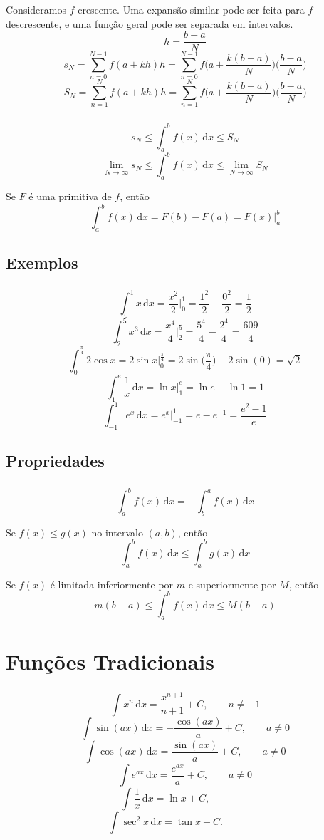 \documentclass[10 pt]{beamer}
\newcommand{\makesection}[1]{\section[#1]{#1}}
\newcommand{\makesubsection}[1]{\subsection[#1]{#1}}
\newcommand{\dif}{\,\mathrm{d}}
\newcommand{\myframe}[1]{
\begin{frame}
 \frametitle{\insertsection \qquad {\small \insertsubsection}}
#1
\end{frame}}
\newcommand{\limite}[2]{\lim_{{#1}\rightarrow{#2}}}
\newcommand{\fromto}[2]{\bigg|_{#1}^{#2}}
\begin{document}
\myframe{
  Consideramos $f$ crescente. Uma expansão similar pode ser feita para $f$
    descrescente, e uma função geral pode ser separada em intervalos.
  $$ h = \frac{b-a}{N} $$
  \vspace{0.5cm}
  $$ s_N = \sum_{n=0}^{N-1} f(a + kh)h
    = \sum_{n=0}^{N-1} f\bigg(a + \frac{k(b-a)}{N}\bigg)\bigg(\frac{b-a}{N}\bigg) $$
  $$ S_N = \sum_{n=1}^{N} f(a + kh)h
    = \sum_{n=1}^{N} f\bigg(a + \frac{k(b-a)}{N}\bigg)\bigg(\frac{b-a}{N}\bigg) $$
}

\myframe{
  $$ s_N \leq \int_a^b\! f(x)\dif x \leq S_N $$
  $$ \limite{N}{\infty} s_N \leq \int_a^b\! f(x)\dif x
    \leq \limite{N}{\infty} S_N $$
  \vspace{0.5cm}

  Se $F$ é uma primitiva de $f$, então
  $$ \int_a^b\!f(x)\dif x = F(b) - F(a) = F(x)\fromto{a}{b} $$
}

\makesubsection{Exemplos}

\myframe{
  $$ \int_0^1\!x\dif x = \frac{x^2}{2}\fromto{0}{1} =
    \frac{1^2}{2} - \frac{0^2}{2} = \frac{1}{2} $$
  $$ \int_2^5\!x^3\dif x = \frac{x^4}{4}\fromto{2}{5} =
    \frac{5^4}{4} - \frac{2^4}{4} = \frac{609}{4} $$
  $$ \int_0^{\frac{\pi}{4}}\!2\cos x = 2\sin x\fromto{0}{\frac{\pi}{4}} =
    2\sin\bigg(\frac{\pi}{4}\bigg) - 2\sin(0) = \sqrt{2}$$
  $$ \int_1^e\!\frac{1}{x}\dif x = \ln x\fromto{1}{e} =
    \ln e - \ln 1 = 1 $$
  $$ \int_{-1}^1\!e^x\dif x = e^x\fromto{-1}{1} =
    e - e^{-1} = \frac{e^2-1}{e}$$
}

\makesubsection{Propriedades}

\myframe{
  $$ \int_a^b\!f(x)\dif x = -\int_b^a\!f(x)\dif x $$
  \vspace{0.5cm}

  Se $f(x) \leq g(x)$ no intervalo $(a,b)$, então
  $$ \int_a^b\!f(x)\dif x \leq \int_a^b\!g(x)\dif x $$

  \vspace{0.5cm}
  Se $f(x)$ é limitada inferiormente por $m$ e superiormente por $M$, então
  $$ m(b-a) \leq \int_a^b\!f(x)\dif x \leq M(b-a) $$
}

\makesection{Funções Tradicionais}

\myframe{
  $$ \int\!x^n\dif x = \frac{x^{n+1}}{n+1} + C, \qquad n\neq-1 $$
  $$ \int\!\sin(ax)\dif x = -\frac{\cos(ax)}{a} + C, \qquad a \neq 0 $$
  $$ \int\!\cos(ax)\dif x = \frac{\sin(ax)}{a} + C, \qquad a \neq 0 $$
  $$ \int\!e^{ax}\dif x = \frac{e^{ax}}{a} + C, \qquad a \neq 0 $$
  $$ \int\!\frac{1}{x}\dif x = \ln x + C, \qquad \qquad $$
  $$ \int\!\sec^2 x\dif x = \tan x + C. \qquad \qquad $$
}
\end{document}
